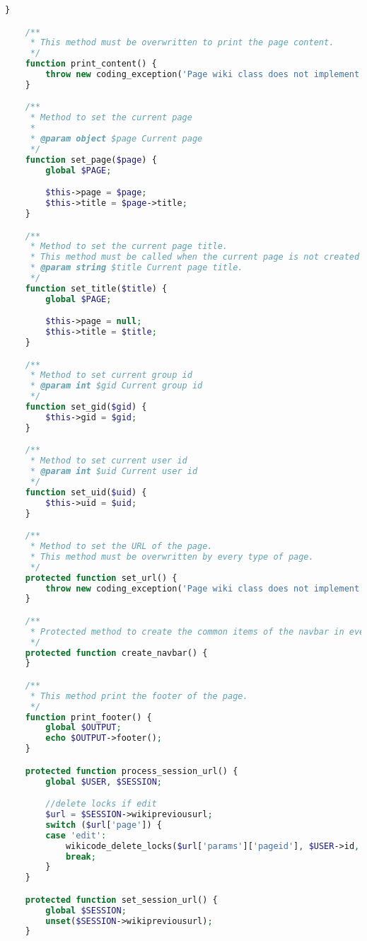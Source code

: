 \begin{lstlisting}[language=PHP]
    }

    /**
     * This method must be overwritten to print the page content.
     */
    function print_content() {
        throw new coding_exception('Page wiki class does not implement method print_content()');
    }

    /**
     * Method to set the current page
     *
     * @param object $page Current page
     */
    function set_page($page) {
        global $PAGE;

        $this->page = $page;
        $this->title = $page->title;
    }

    /**
     * Method to set the current page title.
     * This method must be called when the current page is not created yet.
     * @param string $title Current page title.
     */
    function set_title($title) {
        global $PAGE;

        $this->page = null;
        $this->title = $title;
    }

    /**
     * Method to set current group id
     * @param int $gid Current group id
     */
    function set_gid($gid) {
        $this->gid = $gid;
    }

    /**
     * Method to set current user id
     * @param int $uid Current user id
     */
    function set_uid($uid) {
        $this->uid = $uid;
    }

    /**
     * Method to set the URL of the page.
     * This method must be overwritten by every type of page.
     */
    protected function set_url() {
        throw new coding_exception('Page wiki class does not implement method set_url()');
    }

    /**
     * Protected method to create the common items of the navbar in every page type.
     */
    protected function create_navbar() {
    }

    /**
     * This method print the footer of the page.
     */
    function print_footer() {
        global $OUTPUT;
        echo $OUTPUT->footer();
    }

    protected function process_session_url() {
        global $USER, $SESSION;

        //delete locks if edit
        $url = $SESSION->wikipreviousurl;
        switch ($url['page']) {
        case 'edit':
            wikicode_delete_locks($url['params']['pageid'], $USER->id, $url['params']['section'], false);
            break;
        }
    }

    protected function set_session_url() {
        global $SESSION;
        unset($SESSION->wikipreviousurl);
    }
	

\end{lstlisting}

